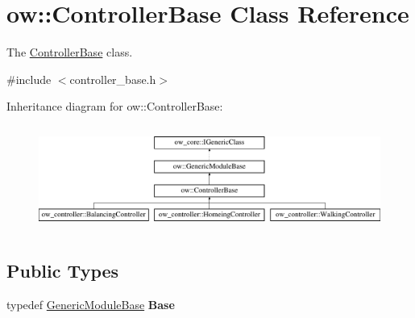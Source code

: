 \hypertarget{classow_1_1ControllerBase}{}\section{ow\+:\+:Controller\+Base Class Reference}
\label{classow_1_1ControllerBase}


The \hyperlink{classow_1_1ControllerBase}{Controller\+Base} class.  




{\ttfamily \#include $<$controller\+\_\+base.\+h$>$}

Inheritance diagram for ow\+:\+:Controller\+Base\+:\begin{figure}[H]
\begin{center}
\leavevmode
\includegraphics[height=3.472868cm]{dc/dbc/classow_1_1ControllerBase}
\end{center}
\end{figure}
\subsection*{Public Types}
\begin{DoxyCompactItemize}
\item 
typedef \hyperlink{classow_1_1GenericModuleBase}{Generic\+Module\+Base} {\bfseries Base}\hypertarget{classow_1_1ControllerBase_a720d137e6be799c7788e33e61c279c06}{}\label{classow_1_1ControllerBase_a720d137e6be799c7788e33e61c279c06}

\end{DoxyCompactItemize}
